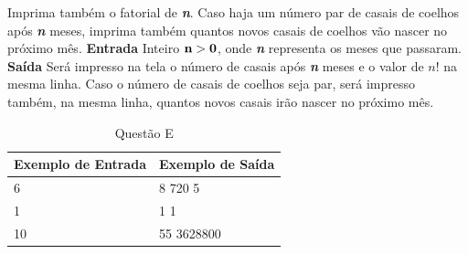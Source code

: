 \documentclass[a4paper, 12pt]{article}
\begin{document}
Imprima também o fatorial de \textbf{\textit{n}}. \newline \newline
Caso haja um número par de casais de coelhos após \textbf{\textit{n}} meses, imprima também quantos novos casais de coelhos vão nascer no próximo mês.
\newline \newline
\textbf{{\large Entrada}} \newline
Inteiro $\textrm{\textbf{n}} > \textrm{\textbf{0}}$, onde \textbf{\textit{n}} representa os meses que passaram.
\newline \newline
\textbf{{\large Saída}} \newline
Será impresso na tela o número de casais após \textbf{\textit{n}} meses e o valor de $n!$ na mesma linha. Caso o número de casais de coelhos seja par, será impresso também, na mesma linha, quantos novos casais irão nascer no próximo mês.
\newline
\begin{table}[H]
	\centering
	\begin{tabular}{|l|l|}
	\hline
	\textbf{Exemplo de Entrada} & \textbf{Exemplo de Saída} \\ \hline
	6 & 8 720 5 \\ \hline
	1 & 1 1 \\ \hline
	10 & 55 3628800 \\ \hline
	\end{tabular}
	\caption{Questão E}
	\label{tabela5}
\end{table}
\end{document}
